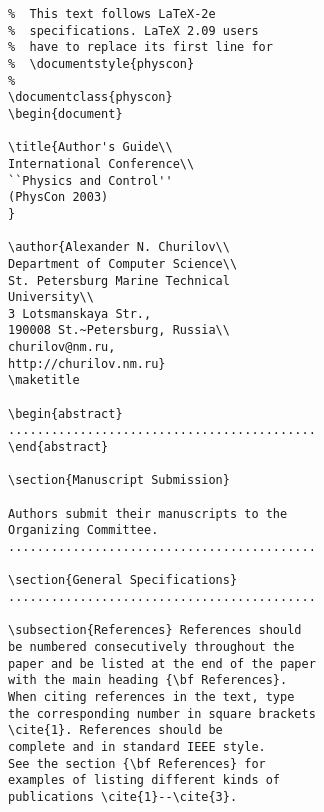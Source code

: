 \documentclass{physcon}
\begin{document}
\begin{verbatim}
%  This text follows LaTeX-2e  
%  specifications. LaTeX 2.09 users 
%  have to replace its first line for
%  \documentstyle{physcon}  
%
\documentclass{physcon}  
\begin{document}

\title{Author's Guide\\
International Conference\\
``Physics and Control'' 
(PhysCon 2003)
}

\author{Alexander N. Churilov\\                               
Department of Computer Science\\
St. Petersburg Marine Technical 
University\\
3 Lotsmanskaya Str.,
190008 St.~Petersburg, Russia\\
churilov@nm.ru, 
http://churilov.nm.ru}
\maketitle

\begin{abstract}
...........................................
\end{abstract}

\section{Manuscript Submission}

Authors submit their manuscripts to the 
Organizing Committee.
...........................................  

\section{General Specifications}
...........................................  

\subsection{References} References should 
be numbered consecutively throughout the 
paper and be listed at the end of the paper 
with the main heading {\bf References}. 
When citing references in the text, type 
the corresponding number in square brackets 
\cite{1}. References should be 
complete and in standard IEEE style. 
See the section {\bf References} for 
examples of listing different kinds of 
publications \cite{1}--\cite{3}.


\end{verbatim}
\end{document}
